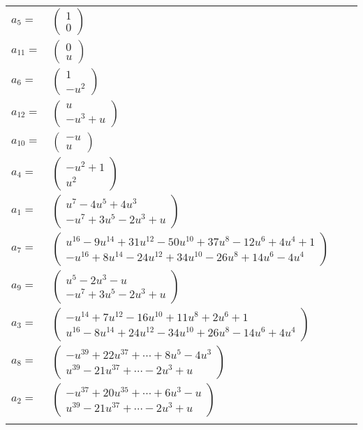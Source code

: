 \documentclass[1p]{elsarticle_modified}
\theoremstyle{definition}
\begin{document}
\begin{tabular}{m{7pt} m{180pt} m{7pt} m{180pt} }
\flushright $a_{5}=$&$\begin{pmatrix}1\\0\end{pmatrix}$ \\
\flushright $a_{11}=$&$\begin{pmatrix}0\\u\end{pmatrix}$ \\
\flushright $a_{6}=$&$\begin{pmatrix}1\\- u^2\end{pmatrix}$ \\
\flushright $a_{12}=$&$\begin{pmatrix}u\\- u^3+u\end{pmatrix}$ \\
\flushright $a_{10}=$&$\begin{pmatrix}- u\\u\end{pmatrix}$ \\
\flushright $a_{4}=$&$\begin{pmatrix}- u^2+1\\u^2\end{pmatrix}$ \\
\flushright $a_{1}=$&$\begin{pmatrix}u^7-4 u^5+4 u^3\\- u^7+3 u^5-2 u^3+u\end{pmatrix}$ \\
\flushright $a_{7}=$&$\begin{pmatrix}u^{16}-9 u^{14}+31 u^{12}-50 u^{10}+37 u^8-12 u^6+4 u^4+1\\- u^{16}+8 u^{14}-24 u^{12}+34 u^{10}-26 u^8+14 u^6-4 u^4\end{pmatrix}$ \\
\flushright $a_{9}=$&$\begin{pmatrix}u^5-2 u^3- u\\- u^7+3 u^5-2 u^3+u\end{pmatrix}$ \\
\flushright $a_{3}=$&$\begin{pmatrix}- u^{14}+7 u^{12}-16 u^{10}+11 u^8+2 u^6+1\\u^{16}-8 u^{14}+24 u^{12}-34 u^{10}+26 u^8-14 u^6+4 u^4\end{pmatrix}$ \\
\flushright $a_{8}=$&$\begin{pmatrix}- u^{39}+22 u^{37}+\cdots+8 u^5-4 u^3\\u^{39}-21 u^{37}+\cdots-2 u^3+u\end{pmatrix}$ \\
\flushright $a_{2}=$&$\begin{pmatrix}- u^{37}+20 u^{35}+\cdots+6 u^3- u\\u^{39}-21 u^{37}+\cdots-2 u^3+u\end{pmatrix}$\\&\end{tabular}
\end{document}

